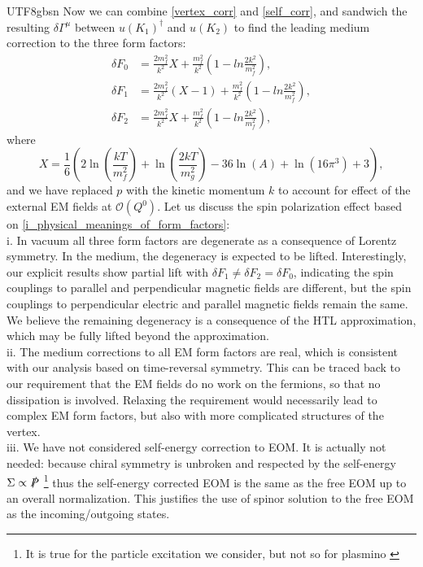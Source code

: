 \documentclass[11pt]{article}\def\baselinestretch{1.4}
\def\d{{\delta}}
\def\G{{\Gamma}}
\def\m{{\mu}}
\def\S{{\Sigma}}
\newcommand{\dg}{\dagger}
\begin{document}
\begin{CJK}{UTF8}{gbsn}
Now we can combine \eqref{vertex_corr} and \eqref{self_corr}, and sandwich the resulting $\d\G^\m$ between $u(K_1)^\dg$ and $u(K_2)$ to find the leading medium correction to the three form factors:
\begin{align}
\delta F_0 &= \frac{2m_f^2}{k^2}X+\frac{m_f^2}{k^2}\left( 1-ln\frac{2k^2}{m_f^2} \right), \label{delta_F_0}\\
\delta F_1 &= \frac{2m_f^2}{k^2}(X-1)+\frac{m_f^2}{k^2}\left( 1-ln\frac{2k^2}{m_f^2} \right), \label{delta_F_1}\\
\delta F_2 &= \frac{2m_f^2}{k^2}X+\frac{m_f^2}{k^2}\left( 1-ln\frac{2k^2}{m_f^2} \right), \label{delta_F_2}
\end{align}
where $$X=\frac{1}{6}\left(2 \ln \left(\frac{kT}{m_f^2}\right)+\ln \left(\frac{2 kT}{m_{g}^2}\right)-36 \ln (A)+\ln \left(16 \pi ^3 \right)+3\right),$$
and we have replaced $p$ with the kinetic momentum $k$ to account for effect of the external EM fields at $\mathcal{O}(Q^0)$.
%
Let us discuss the spin polarization effect based on \eqref{i_physical_meanings_of_form_factors}:\\
%
i. In vacuum all three form factors are degenerate as a consequence of Lorentz symmetry. In the medium, the degeneracy is expected to be lifted. Interestingly, our explicit results show partial lift with $\d F_1\ne\d F_2=\d F_0$, indicating the spin couplings to parallel and perpendicular magnetic fields are different, but the spin couplings to perpendicular electric and parallel magnetic fields remain the same. We believe the remaining degeneracy is a consequence of the HTL approximation, which may be fully lifted beyond the approximation.\\
%
ii. The medium corrections to all EM form factors are real, which is consistent with our analysis based on time-reversal symmetry. This can be traced back to our requirement that the EM fields do no work on the fermions, so that no dissipation is involved. Relaxing the requirement would necessarily lead to complex EM form factors, but also with more complicated structures of the vertex.\\
%
iii. We have not considered self-energy correction to EOM. It is actually not needed: because chiral symmetry is unbroken and respected by the self-energy $\S\propto \slashed{P}$ \footnote{It is true for the particle excitation we consider, but not so for plasmino \cite{le2000thermal}} thus the self-energy corrected EOM is the same as the free EOM up to an overall normalization. This justifies the use of spinor solution to the free EOM as the incoming/outgoing states.\\

\end{CJK}
\end{document}
